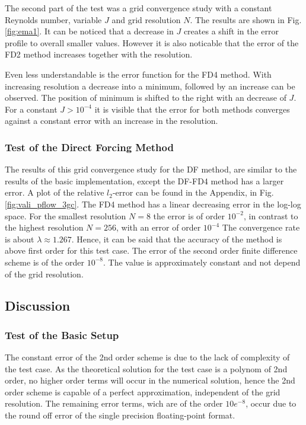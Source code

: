 The second part of the test was a grid convergence study with a constant Reynolds number, variable $J$ and grid resolution $N$.
The results are shown in Fig. \ref{fig:ema1}.
It can be noticed that a decrease in $J$ creates a shift in the error profile to overall smaller values.
However it is also noticable that the error of the FD2 method increases together with the resolution.

Even less understandable is the error function for the FD4 method.
With increasing resolution  a decrease into a minimum, followed by an increase can be observed.
The position of minimum is shifted to the right with an decrease of $J$.
For a constant $J>10^{-4}$ it is visible that the error for both methods converges against a
constant error  with an increase in the resolution.

\clearpage

\subsubsection{Test of the Direct Forcing Method}

The results of this grid convergence study for the DF method,
are similar to the results of the basic implementation, except the DF-FD4 method has a larger error.
A plot of the relative $l_2$-error can be found in the Appendix,  in Fig.\ref{fig:vali_pflow_3gc}.
The FD4 method has a linear decreasing error in the log-log space.
For the smallest resolution $N=8$ the error is of order $10^{-2}$,
in contrast to the highest resolution $N=256$, with an error of order $10^{-4}$
The convergence rate is about $\lambda\approx1.267$.
Hence, it can be said that the accuracy of the method is above first order for this test case.
The error of the second order finite difference scheme is of the order $10^{-8}$.
The value is approximately constant and not depend of the grid resolution.

\subsection{Discussion}
\subsubsection{Test of the Basic Setup}


The constant error of the 2nd order scheme is due to the lack of complexity of the test case.
As the theoretical solution for the test case is a polynom of 2nd order,
no higher order terms will occur in the numerical solution, hence the
2nd order scheme is capable of a perfect approximation, independent of the
grid resolution. The remaining error terms, wich  are of the order $10e^{-8}$,
occur due to the round off error of the single precision floating-point format.

